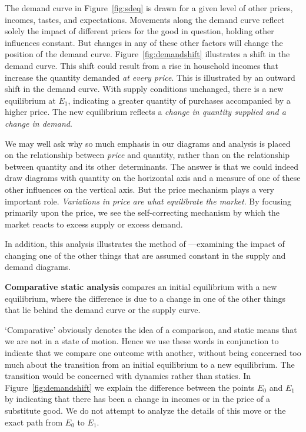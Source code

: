 The demand curve in Figure~\ref{fig:sdeq} is drawn for a given level of
other prices, incomes, tastes, and expectations. Movements along the demand
curve reflect solely the impact of different prices for the good in
question, holding other influences constant. But changes in any of these
other factors will change the position of the demand curve. Figure~\ref{fig:demandshift}
illustrates a shift in the demand curve. This shift could
result from a rise in household incomes that increase the quantity demanded 
\textit{at every price}. This is illustrated by an outward shift in the
demand curve. With supply conditions unchanged, there is a new equilibrium
at $E_{1}$, indicating a greater quantity of purchases accompanied by a
higher price. The new equilibrium reflects a \textit{change in quantity 
supplied and a change in demand}.



\newhtmlpage

We may well ask why so much emphasis in our diagrams and analysis is placed
on the relationship between \textit{price} and quantity, rather than on the
relationship between quantity and its other determinants. The answer is that
we could indeed draw diagrams with quantity on the horizontal axis and a
measure of one of these other influences on the vertical axis. But the price
mechanism plays a very important role. \textit{Variations in price are what
equilibrate the market}. By focusing primarily upon the price, we see the
self-correcting mechanism by which the market reacts to excess supply or
excess demand.

In addition, this analysis illustrates the method of %
---examining the impact of changing one of
the other things that are assumed constant in the supply and demand diagrams.

\begin{DefBox}
\textbf{Comparative static analysis} compares an initial equilibrium with a new equilibrium, where the difference is due to a change in one of the other things that lie behind the demand curve or the supply curve.
\end{DefBox}

`Comparative' obviously denotes the idea of a comparison, and static means
that we are not in a state of motion. Hence we use these words in
conjunction to indicate that we compare one outcome with another, without
being concerned too much about the transition from an initial equilibrium to
a new equilibrium. The transition would be concerned with dynamics rather
than statics. In Figure~\ref{fig:demandshift} we explain the difference
between the points $E_0$ and $E_1$ by indicating that there has been a
change in incomes or in the price of a substitute good. We do not attempt to
analyze the details of this move or the exact path from $E_0$ to $E_1$.

